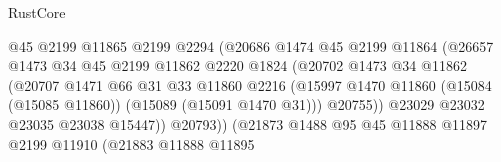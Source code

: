 \begin{lexlean}{RustCore}
\begin{coremodule}
                                        @45
                                        @2199
                                        @11865
                                        @2199
                                        @2294
                                        (@20686
                                          @1474
                                          @45
                                          @2199
                                          @11864
                                          (@26657
                                            @1473
                                            @34
                                            @45
                                            @2199
                                            @11862
                                            @2220
                                            @1824
                                            (@20702
                                              @1473
                                              @34
                                              @11862
                                              (@20707
                                                @1471
                                                @66
                                                @31
                                                @33
                                                @11860
                                                @2216
                                                (@15997
                                                  @1470
                                                  @11860
                                                  (@15084 (@15085 @11860))
                                                  (@15089 (@15091 @1470 @31)))
                                                @20755))
                                            @23029
                                            @23032
                                            @23035
                                            @23038
                                            @15447))
                                        @20793))
                                    (@21873
                                      @1488
                                      @95
                                      @45
                                      @11888
                                      @11897
                                      @2199
                                      @11910
                                      (@21883
                                        @11888
                                        @11895

\end{coremodule}
\end{lexlean}
